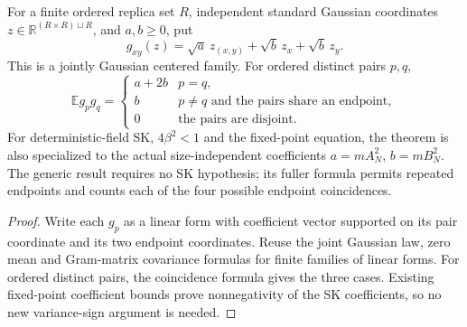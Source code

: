 \begin{theorem}
\label{thm:sg-tal:centered-overlap-gaussian}
\leanok
{}
For a finite ordered replica set $R$, independent standard Gaussian coordinates
$z\in\mathbb R^{(R\times R)\sqcup R}$, and $a,b\ge0$, put
\[
 g_{xy}(z)=\sqrt a\,z_{(x,y)}+\sqrt b\,z_x+\sqrt b\,z_y.
\]
This is a jointly Gaussian centered family. For ordered distinct pairs $p,q$,
\[
 \mathbb E g_p g_q=\begin{cases}
 a+2b&p=q,\\
 b&p\ne q\text{ and the pairs share an endpoint},\\
 0&\text{the pairs are disjoint}.
 \end{cases}
\]
For deterministic-field SK, $4\beta^2<1$ and the fixed-point equation, the theorem
is also specialized to the actual size-independent coefficients $a=mA_N^2$,
$b=mB_N^2$. The generic result requires no SK hypothesis; its fuller formula permits
repeated endpoints and counts each of the four possible endpoint coincidences.
\end{theorem}
\begin{proof}
\leanok
Write each $g_p$ as a linear form with coefficient vector supported on its pair coordinate
and its two endpoint coordinates. Reuse the joint Gaussian law, zero mean and Gram-matrix
covariance formulas for finite families of linear forms. For ordered distinct pairs,
the coincidence formula gives the three cases. Existing fixed-point coefficient bounds
prove nonnegativity of the SK coefficients, so no new variance-sign argument is needed.
\end{proof}

